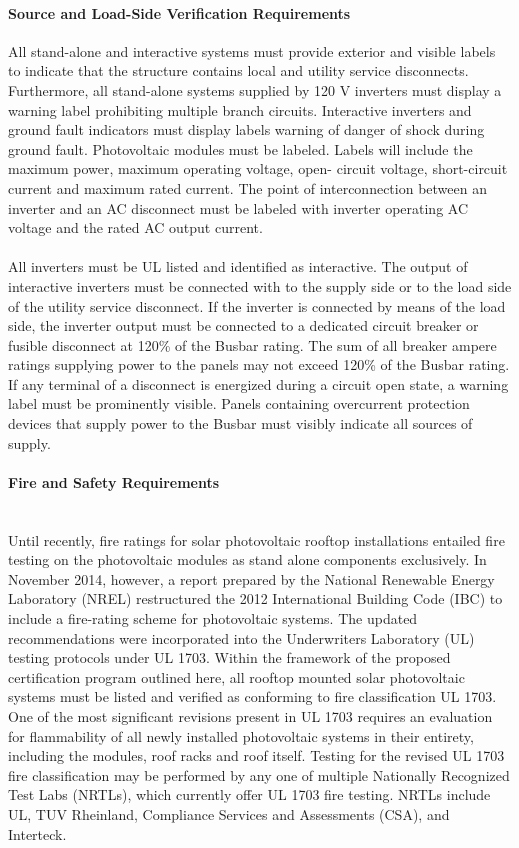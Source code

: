 \paragraph{Source and Load-Side Verification Requirements}
All stand-alone and interactive systems must provide exterior and visible labels to indicate that the structure contains local and utility service disconnects. Furthermore, all stand-alone systems supplied by 120 V inverters must display a warning label prohibiting multiple branch circuits. Interactive inverters and ground fault indicators must display labels warning of danger of shock during ground fault. Photovoltaic modules must be labeled. Labels will include the maximum power, maximum operating voltage, open- circuit voltage, short-circuit current and maximum rated current. The point of interconnection between an inverter and an AC disconnect must be labeled with inverter operating AC voltage and the rated AC output current.
\\\\
\noindent All inverters must be UL listed and identified as interactive. The output of interactive inverters must be connected with to the supply side or to the load side of the utility service disconnect. If the inverter is connected by means of the load side, the inverter output must be connected to a dedicated circuit breaker or fusible disconnect at 120\% of the Busbar rating. The sum of all breaker ampere ratings supplying power to the panels may not exceed 120\% of the Busbar rating. If any terminal of a disconnect is energized during a circuit open state, a warning label must be prominently visible. Panels containing overcurrent protection devices that supply power to the Busbar must visibly indicate all sources of supply.

\paragraph{Fire and Safety Requirements}\mbox{ }\\
Until recently, fire ratings for solar photovoltaic rooftop installations entailed fire testing on the photovoltaic modules as stand alone components exclusively. In November 2014, however, a report prepared by the National Renewable Energy Laboratory (NREL) restructured the 2012 International Building Code (IBC) to include a fire-rating scheme for photovoltaic systems. The updated recommendations were incorporated into the Underwriters Laboratory (UL) testing protocols under UL 1703. Within the framework of the proposed certification program outlined here, all rooftop mounted solar photovoltaic systems must be listed and verified as conforming to fire classification UL 1703. One of the most significant revisions present in UL 1703 requires an evaluation for flammability of all newly installed photovoltaic systems in their entirety, including the modules, roof racks and roof itself. Testing for the revised UL 1703 fire classification may be performed by any one of multiple Nationally Recognized Test Labs (NRTLs), which currently offer UL 1703 fire testing. NRTLs include UL, TUV Rheinland, Compliance Services and Assessments (CSA), and Interteck.

